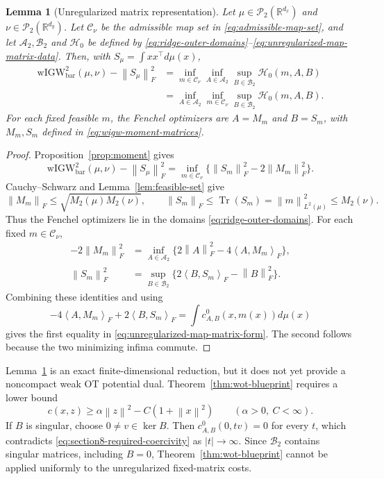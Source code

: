 \documentclass[11pt]{article}
\newcommand{\R}{\mathbb R}
\newcommand{\cP}{\mathcal P}
\newcommand{\ip}[2]{\left\langle #1,#2\right\rangle}
\newcommand{\norm}[1]{\left\lVert #1\right\rVert}
\newcommand{\wIGW}{\mathrm{wIGW}_{\mathrm{bar}}}
\DeclareMathOperator{\Tr}{Tr}
\theoremstyle{plain}
\newtheorem{lemma}[theorem]{Lemma}
\theoremstyle{definition}
\theoremstyle{remark}
\begin{document}
\begin{lemma}[Unregularized matrix representation]
\label{lem:unregularized-map-matrix}
Let \(\mu\in\cP_2(\R^{d_x})\) and
\(\nu\in\cP_2(\R^{d_y})\). Let \(\mathcal C_\nu\) be the admissible map set in
\eqref{eq:admissible-map-set}, and let \(\mathcal A_2,\mathcal B_2\) and
\(\mathcal H_0\) be defined by
\eqref{eq:ridge-outer-domains}--\eqref{eq:unregularized-map-matrix-data}.
Then, with \(S_\mu=\int xx^\top d\mu(x)\),
\begin{equation}\label{eq:unregularized-map-matrix-form}
\begin{aligned}
 \wIGW^2(\mu,\nu)-\norm{S_\mu}_F^2
 &=\inf_{m\in\mathcal C_\nu}\inf_{A\in\mathcal A_2}
   \sup_{B\in\mathcal B_2}\mathcal H_0(m,A,B)\\
 &=\inf_{A\in\mathcal A_2}\inf_{m\in\mathcal C_\nu}
   \sup_{B\in\mathcal B_2}\mathcal H_0(m,A,B).
\end{aligned}
\end{equation}
For each fixed feasible \(m\), the Fenchel optimizers are
\(A=M_m\) and \(B=S_m\), with \(M_m,S_m\) defined in
\eqref{eq:wigw-moment-matrices}.
\end{lemma}

\begin{proof}
Proposition~\ref{prop:moment} gives
\[
 \wIGW^2(\mu,\nu)-\norm{S_\mu}_F^2
 =\inf_{m\in\mathcal C_\nu}
   \{\norm{S_m}_F^2-2\norm{M_m}_F^2\}.
\]
Cauchy--Schwarz and Lemma~\ref{lem:feasible-set} give
\[
 \norm{M_m}_F\le\sqrt{M_2(\mu)M_2(\nu)},\qquad
 \norm{S_m}_F\le\Tr(S_m)=\norm m_{L^2(\mu)}^2\le M_2(\nu).
\]
Thus the Fenchel optimizers lie in the domains
\eqref{eq:ridge-outer-domains}. For each fixed \(m\in\mathcal C_\nu\),
\begin{align*}
 -2\norm{M_m}_F^2
 &=\inf_{A\in\mathcal A_2}
   \{2\norm A_F^2-4\ip{A}{M_m}_F\},\\
 \norm{S_m}_F^2
 &=\sup_{B\in\mathcal B_2}
   \{2\ip{B}{S_m}_F-\norm B_F^2\}.
\end{align*}
Combining these identities and using
\[
 -4\ip{A}{M_m}_F+2\ip{B}{S_m}_F
 =\int c_{A,B}^0(x,m(x))d\mu(x)
\]
gives the first equality in
\eqref{eq:unregularized-map-matrix-form}. The second follows because the two
minimizing infima commute.
\end{proof}

Lemma~\ref{lem:unregularized-map-matrix} is an exact finite-dimensional
reduction, but it does not yet provide a noncompact weak OT potential dual.
Theorem~\ref{thm:wot-blueprint} requires a lower bound
\begin{equation}\label{eq:section8-required-coercivity}
 c(x,z)\ge \alpha\norm z^2-C(1+\norm x^2)
 \qquad(\alpha>0,\ C<\infty).
\end{equation}
If \(B\) is singular, choose \(0\ne v\in\ker B\). Then
\(c_{A,B}^0(0,tv)=0\) for every \(t\), which contradicts
\eqref{eq:section8-required-coercivity} as \(|t|\to\infty\).
Since \(\mathcal B_2\) contains singular matrices, including \(B=0\),
Theorem~\ref{thm:wot-blueprint} cannot be applied uniformly to the
unregularized fixed-matrix costs.
\end{document}
